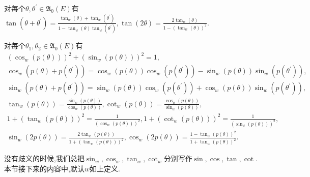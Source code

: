 \begin{proposition}{}{}
	对每个$\theta,\theta^{\prime}\in\mathfrak{A}_{0}\left(E\right)$有$\tan\left(\theta+\theta^{\prime}\right)=\frac{\tan_{w}\left(\theta\right)+\tan_{w}\left(\theta^{\prime}\right)}{1-\tan_{w}\left(\theta\right)\tan_{w}\left(\theta^{\prime}\right)},\tan\left(2\theta\right)=\frac{2\tan_{w}\left(\theta\right)}{1-\left(\tan_{w}\left(\theta\right)\right)^{2}}$.
\end{proposition}

\begin{proposition}{}{}
	对每个$\theta_{1},\theta_{2}\in\mathfrak{A}_{0}\left(E\right)$有
	\begin{gather*}
		\left(\cos_{w}\left(p\left(\theta\right)\right)\right)^{2}+\left(\sin_{w}\left(p\left(\theta\right)\right)\right)^{2}=1,\\
		\cos_{w}\left(p\left(\theta\right)+p\left(\theta^{\prime}\right)\right)=\cos_{w}\left(p\left(\theta\right)\right)\cos_{w}\left(p\left(\theta^{\prime}\right)\right)-\sin_{w}\left(p\left(\theta\right)\right)\sin_{w}\left(p\left(\theta^{\prime}\right)\right),\\
		\sin_{w}\left(p\left(\theta\right)+p\left(\theta^{\prime}\right)\right)=\sin_{w}\left(p\left(\theta\right)\right)\cos_{w}\left(p\left(\theta^{\prime}\right)\right)+\cos_{w}\left(p\left(\theta\right)\right)\sin_{w}\left(p\left(\theta^{\prime}\right)\right),\\
		\tan_{w}\left(p\left(\theta\right)\right)=\frac{\sin_{w}\left(p\left(\theta\right)\right)}{\cos_{w}\left(p\left(\theta\right)\right)},\cot_{w}\left(p\left(\theta\right)\right)=\frac{\cos_{w}\left(p\left(\theta\right)\right)}{\sin_{w}\left(p\left(\theta\right)\right)},\\
		1+\left(\tan_{w}\left(p\left(\theta\right)\right)\right)^{2}=\frac{1}{\left(\cos_{w}\left(p\left(\theta\right)\right)\right)^{2}},1+\left(\cot_{w}\left(p\left(\theta\right)\right)\right)^{2}=\frac{1}{\left(\sin_{w}\left(p\left(\theta\right)\right)\right)^{2}},\\
		\sin_{w}\left(2p\left(\theta\right)\right)=\frac{2\tan_{w}\left(p\left(\theta\right)\right)}{1+\left(\tan_{w}\left(p\left(\theta\right)\right)\right)^{2}},\cos_{w}\left(2p\left(\theta\right)\right)=\frac{1-\tan_{w}\left(p\left(\theta\right)\right)^{2}}{1+\tan_{w}\left(p\left(\theta\right)\right)^{2}}.
	\end{gather*}
\end{proposition}

\begin{remark}{}{}
	没有歧义的时候,我们总把$\sin_{w},\cos_{w},\tan_{w},\cot_{w}$分别写作$\sin,\cos,\tan,\cot$.本节接下来的内容中,默认$w$如上定义.
\end{remark}

